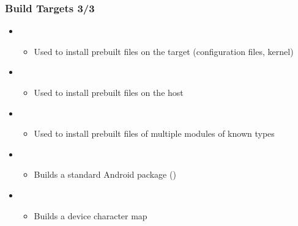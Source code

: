 \begin{frame}
  \frametitle{Build Targets 3/3}
  \begin{itemize}
  \item {}
    \begin{itemize}
    \item Used to install prebuilt files on the target (configuration
      files, kernel)
    \end{itemize}
  \item {}
    \begin{itemize}
    \item Used to install prebuilt files on the host
    \end{itemize}
  \item {}
    \begin{itemize}
    \item Used to install prebuilt files of multiple modules of known
      types
    \end{itemize}
  \item {}
    \begin{itemize}
    \item Builds a standard Android package ()
    \end{itemize}
  \item {}
    \begin{itemize}
    \item Builds a device character map
    \end{itemize}
  \end{itemize}
\end{frame}

